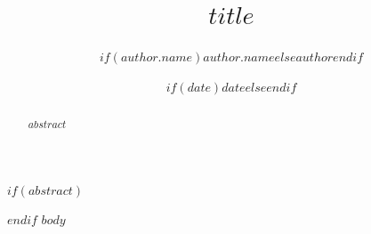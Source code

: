 \documentclass[11pt]{article}
\title{$title$}
\author{$if(author.name)$$author.name$$else$$author$$endif$}
\affil{$author.affiliation$}
\author{}
\date{$if(date)$$date$$else$$endif$}
\begin{document}
\maketitle
$if(abstract)$
\begin{abstract}
$abstract$
\end{abstract}
$endif$
$body$
\end{document}
